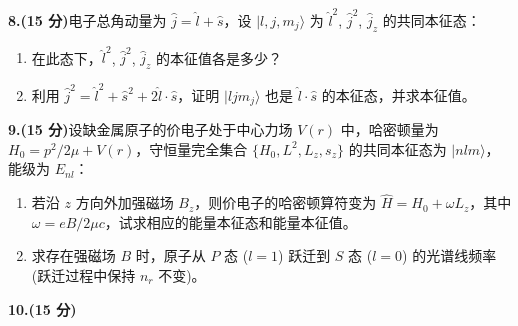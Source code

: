 \textbf{8.(15 分)}电子总角动量为 $\hat{j} = \hat{l} + \hat{s}$，设 $|l, j, m_j \rangle$ 为 $\hat{l}^2$, $\hat{j}^2$, $\hat{j}_z$ 的共同本征态：

\begin{enumerate}
    \item 在此态下，$\hat{l}^2$, $\hat{j}^2$, $\hat{j}_z$ 的本征值各是多少？
    \item 利用 $\hat{j}^2 = \hat{l}^2 + \hat{s}^2 + 2\hat{l} \cdot \hat{s}$，证明 $|l j m_j\rangle$ 也是 $\hat{l} \cdot \hat{s}$ 的本征态，并求本征值。
\end{enumerate}

\textbf{9.(15 分)}设缺金属原子的价电子处于中心力场 $V(r)$ 中，哈密顿量为 $H_0 = p^2/2\mu + V(r)$，守恒量完全集合 $\{H_0, L^2, L_z, s_z\}$ 的共同本征态为 $|n l m\rangle$，能级为 $E_{nl}$：

\begin{enumerate}
    \item  若沿 $z$ 方向外加强磁场 $B_z$，则价电子的哈密顿算符变为 $\hat{H} = H_0 + \omega L_z$，其中 $\omega = eB/2\mu c$，试求相应的能量本征态和能量本征值。
    \item  求存在强磁场 $B$ 时，原子从 $P$ 态 ($l = 1$) 跃迁到 $S$ 态 ($l = 0$) 的光谱线频率 (跃迁过程中保持 $n_r$ 不变)。
\end{enumerate}

\textbf{10.(15 分)}